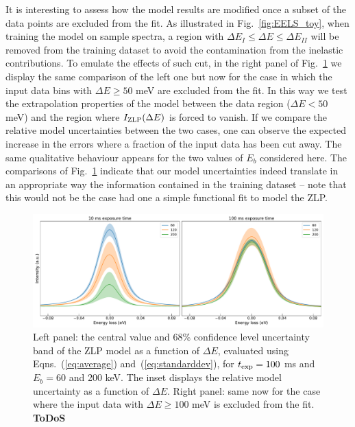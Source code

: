 It is interesting to assess how the model results are modified once a subset of the data points
are excluded from the fit.
%
As illustrated in Fig.~\ref{fig:EELS_toy}, when training the model on sample spectra, a region
with $\Delta E_I \le \Delta E \le \Delta E_{II}$ will be removed from the training dataset to avoid the
contamination from the inelastic contributions.
%
To emulate the effects of such cut, in the right panel of Fig.~\ref{fig:EELS_vacuum_DeltaE} we
display the same comparison of the left one but now
for the case in which the input data bins with $\Delta E \ge 50$ meV are excluded from the fit.
%
In this way we test the extrapolation properties of the model between the data region ($\Delta E < 50$ meV)
and the region where $I_{\rm ZLP}(\Delta E)$ is forced to vanish.
%
If we compare the relative model uncertainties between the two cases, one can observe the expected
increase in the errors where a fraction of the input data has been cut away.
%
The same qualitative behaviour appears for the two values of $E_b$ considered here.
%
The comparisons of Fig.~\ref{fig:EELS_vacuum_DeltaE} indicate that our model uncertainties
indeed translate in an appropriate way the information contained in the training dataset -- note that
this would not be the case had one a simple functional fit to model the ZLP.

\begin{figure}[h]
    \centering
    \includegraphics[width=120mm]{plots/120keV.pdf}
    \caption{Left panel: the central value and 68\% confidence level uncertainty band of the ZLP model as a function
      of $\Delta E$,
      evaluated using Eqns.~(\ref{eq:average}) and~(\ref{eq:standarddev}), for $t_{\rm exp}=100$ ms
      and $E_{b}=60$ and 200 keV.
      The inset displays the relative model uncertainty as a function of $\Delta E$.
      Right panel: same now for the case where the input data with $\Delta E \ge 100$ meV is excluded from the fit.
      {\bf  ToDoS}}
    \label{fig:EELS_vacuum_DeltaE}
\end{figure}


